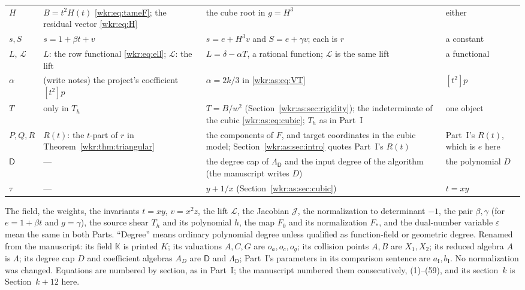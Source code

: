 \documentclass[11pt,a4paper]{article}
\numberwithin{equation}{section}
\theoremstyle{definition}
\theoremstyle{remark}
\newcommand{\J}{\mathcal{J}}
\newcommand{\eps}{\varepsilon}
\newcommand{\Dcap}{\mathsf D}
\begin{document}
\begin{longtable}{@{}>{\raggedright}p{}>{\raggedright}p{}>{\raggedright}p{}>{\raggedright\arraybackslash}p{}@{}}
$H$ & $B=t^2H(t)$ \eqref{wkr:eq:tameF}; the residual vector
\eqref{wkr:eq:H} & the cube root in $g=H^3$ & either\\
$s,S$ & $s=1+\beta t+v$ & $s=e+H^3v$ and $S=e+\gamma v$; each is $r$ & a
constant\\
$L$, $\mathcal L$ & $L$: the row functional \eqref{wkr:eq:ell};
$\mathcal L$: the lift & $L=\delta-\alpha T$, a rational function;
$\mathcal L$ is the same lift & a functional\\
$\alpha$ & (write notes) the project's coefficient $[t^2]p$ & $\alpha=2k/3$
in \eqref{wkr:as:eq:VT} & $[t^2]p$\\
$T$ & only in $T_h$ & $T=B/w^2$ (Section~\ref{wkr:as:sec:rigidity}); the
indeterminate of the cubic \eqref{wkr:as:eq:cubic}; $T_h$ as in Part~I &
one object\\
$P,Q,R$ & $R(t)$: the $t$-part of $r$ in Theorem~\ref{wkr:thm:triangular}
& the components of $F$, and target coordinates in the cubic model;
Section~\ref{wkr:as:sec:intro} quotes Part~I's $R(t)$ &
Part~I's $R(t)$, which is $e$ here\\
$\Dcap$ & --- & the degree cap of $\Lambda_{\Dcap}$ and the input degree of
the algorithm (the manuscript writes $D$) & the polynomial $D$\\
$\tau$ & --- & $y+1/x$ (Section~\ref{wkr:as:sec:cubic}) & $t=xy$\\
\bottomrule
\end{longtable}
\endgroup

The field, the weights, the invariants $t=xy$, $v=x^2z$, the lift
$\mathcal L$, the Jacobian $\J$, the normalization to determinant $-1$,
the pair $\beta,\gamma$ (for $e=1+\beta t$ and $g=\gamma$), the source
shear $T_h$ and its polynomial $h$, the map $F_0$ and its normalization
$F_*$, and the dual-number variable $\eps$ mean the same in both Parts.
``Degree'' means ordinary polynomial degree unless qualified as
function-field or geometric degree. Renamed from the manuscript: its field
$\mathbb K$ is printed $K$; its valuations $A,C,G$ are $o_a,o_c,o_g$; its
collision points $A,B$ are $X_1,X_2$; its reduced algebra $A$ is
$\Lambda$; its degree cap $D$ and coefficient algebras $A_D$ are $\Dcap$
and $\Lambda_{\Dcap}$; Part~I's parameters in its comparison sentence are
$a_{\mathrm I},b_{\mathrm I}$. No normalization was changed. Equations are
numbered by section, as in Part~I; the manuscript numbered them
consecutively, (1)--(59), and its section~$k$ is Section~$k+12$ here.
\end{document}

